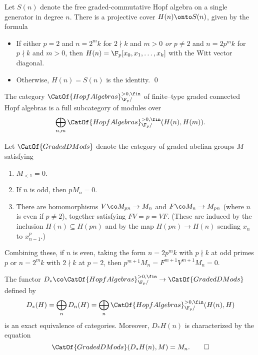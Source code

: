 \begin{theorem}
Let $S(n)$ denote the free graded-commutative Hopf algebra on a single generator in degree $n$.  There is a projective cover $H(n) \onto S(n)$, given by the formula
\begin{itemize}
\item If either $p = 2$ and $n = 2^m k$ for $2 \nmid k$ and $m > 0$ \emph{or} $p \ne 2$ and $n = 2p^m k$ for $p \nmid k$ and $m > 0$, then $H(n) = \F_p[x_0, x_1, \ldots, x_k]$ with the Witt vector diagonal.
\item Otherwise, $H(n) = S(n)$ is the identity.
\qed
\end{itemize}
\end{theorem}

\begin{corollary}
The category $\CatOf{HopfAlgebras}^{> 0, \fin}_{\F_p/}$ of finite--type graded connected Hopf algebras is a full subcategory of modules over \[\bigoplus_{n, m} \CatOf{HopfAlgebras}^{> 0, \fin}_{\F_p/}(H(n), H(m)).\]
\end{corollary}

\begin{definition}
Let $\CatOf{GradedDMods}$ denote the category of graded abelian groups $M$ satisfying
\begin{enumerate}
\item $M_{< 1} = 0$.
\item If $n$ is odd, then $pM_n = 0$.
\item There are homomorphisms $V\co M_{pn} \to M_n$ and $F\co M_n \to M_{pn}$ (where $n$ is even if $p \ne 2$), together satisfying $FV = p = VF$.  (These are induced by the inclusion $H(n) \subseteq H(pn)$ and by the map $H(pn) \to H(n)$ sending $x_n$ to $x_{n-1}^p$.)
\end{enumerate}
\end{definition}

\begin{remark}
Combining these, if $n$ is even, taking the form $n = 2p^m k$ with $p \nmid k$ at odd primes $p$ or $n = 2^m k$ with $2 \nmid k$ at $p = 2$, then $p^{m+1} M_n = F^{m+1} V^{m+1} M_n = 0$.
\end{remark}

\begin{theorem}
The functor $D_*\co \CatOf{HopfAlgebras}^{>0, \fin}_{\F_p/} \to \CatOf{GradedDMods}$ defined by \[D_*(H) = \bigoplus_n D_n(H) = \bigoplus_n \CatOf{HopfAlgebras}^{>0, \fin}_{\F_p/}(H(n), H)\] is an exact equivalence of categories.  Moreover, $D_* H(n)$ is characterized by the equation \[\CatOf{GradedDMods}(D_* H(n), M) = M_n. \qed\]
\end{theorem}


